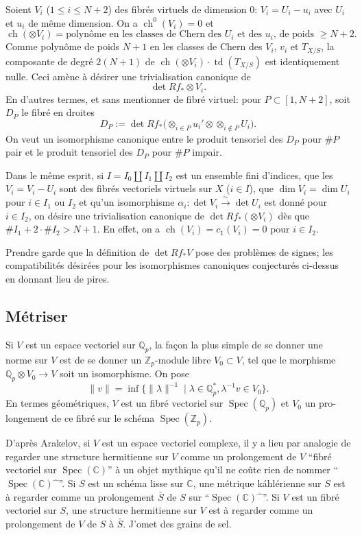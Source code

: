 \documentclass[12pt,a4paper]{article}
\theoremstyle{plain}
\theoremstyle{definition}
\DeclareMathOperator{\ch}{ch}
\DeclareMathOperator{\td}{td}
\DeclareMathOperator{\Spec}{Spec}
\newcommand{\ZZ}{\mathbb{Z}}
\newcommand{\QQ}{\mathbb{Q}}
\newcommand{\CC}{\mathbb{C}}
\begin{document}
Soient $V_i$ ($1 \leq i \leq N+2$) des fibr\'es virtuels de dimension 0: $V_i =
U_i - u_i$ avec $U_i$ et $u_i$ de m\^eme dimension. On a $\ch^0(V_i) = 0$ et
\[
\ch(\otimes V_i) = \text{polyn\^ome en les classes de Chern des $U_i$ et des $u_i$, de poids } \geq N+2 .
\]
Comme polyn\^ome de poids $N+1$ en les classes de Chern des $V_i$, $v_i$ et $T_{X/S}$,
la composante de degr\'e $2(N+1)$ de $\ch(\otimes V_i) \cdot \td(T_{X/S})$ est identiquement nulle.
Ceci am\`ene \`a d\'esirer une trivialisation canonique de
\[
\det Rf_* \otimes V_i .
\]
En d'autres termes, et sans mentionner de fibr\'e virtuel: pour $P \subset [1, N+2]$,
soit $D_P$ le fibr\'e en droites
\[
D_P := \det Rf_* \bigl(\otimes_{i \in P} u_i' \otimes \otimes_{i \notin P} U_i\bigr) .
\]
On veut un isomorphisme canonique entre le produit tensoriel des $D_P$ pour $\#P$
pair et le produit tensoriel des $D_P$ pour $\#P$ impair.

Dans le m\^eme esprit, si $I = I_0 \amalg I_1 \amalg I_2$ est un ensemble fini d'indices,
que les $V_i = V_i - U_i$ sont des fibr\'es vectoriels virtuels sur $X$ ($i \in I$), que
$\dim V_i = \dim U_i$ pour $i \in I_1$ ou $I_2$ et qu'un isomorphisme $\alpha_i: \det V_i \xrightarrow{\sim}
\det U_i$ est donn\'e pour $i \in I_2$, on d\'esire une trivialisation canonique de
$\det Rf_* (\otimes V_i)$ d\`es que $\#I_1 + 2 \cdot \#I_2 > N+1$. En effet, on a $\ch(V_i) = c_1(V_i)
= 0$ pour $i \in I_2$.

Prendre garde que la d\'efinition de $\det Rf_* V$ pose des probl\`emes de signes;
les compatibilit\'es d\'esir\'ees pour les isomorphismes canoniques conjectur\'es ci-dessus
en donnant lieu de pires.

\subsection{M\'etriser}

Si $V$ est un espace vectoriel sur $\QQ_p$, la fa\c{c}on la plus simple de se donner
une norme sur $V$ est de se donner un $\ZZ_p$-module libre $V_0 \subset V$, tel que le morphisme
$\QQ_p \otimes V_0 \to V$ soit un isomorphisme. On pose
\[
\|v\| = \inf \{\|\lambda\|^{-1} \mid \lambda \in \QQ_p^*, \lambda^{-1} v \in V_0\} .
\]
En termes g\'eom\'etriques, $V$ est un fibr\'e vectoriel sur $\Spec(\QQ_p)$ et $V_0$ un pro-
longement de ce fibr\'e sur le sch\'ema $\Spec(\ZZ_p)$.

D'apr\`es Arakelov, si $V$ est un espace vectoriel complexe, il y a lieu par
analogie de regarder une structure hermitienne sur $V$ comme un prolongement de
$V$ ``fibr\'e vectoriel sur $\Spec(\CC)$'' \`a un objet mythique qu'il ne co\^ute rien de nommer
``$\Spec(\CC)\widehat{\phantom{x}}$''. Si $S$ est un sch\'ema lisse sur $\CC$, une m\'etrique k\'ahl\'erienne sur
$S$ est \`a regarder comme un prolongement $\bar{S}$ de $S$ sur ``$\Spec(\CC)\widehat{\phantom{x}}$''. Si $V$
est un fibr\'e vectoriel sur $S$, une structure hermitienne sur $V$ est \`a regarder
comme un prolongement de $V$ de $S$ \`a $\bar{S}$. J'omet des grains de sel.
\end{document}
